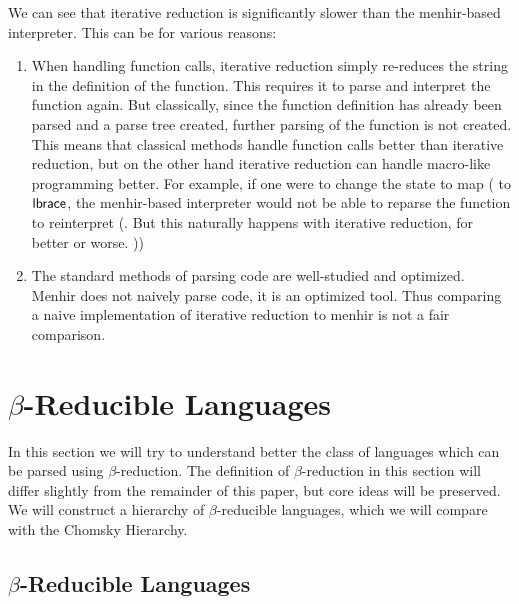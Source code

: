 \documentclass{llncs}
\begin{document}
We can see that iterative reduction is significantly slower than the menhir-based interpreter.
This can be for various reasons:
\begin{enumerate}

    \item When handling function calls, iterative reduction simply re-reduces the string in the definition of the function.
        This requires it to parse and interpret the function again.
        But classically, since the function definition has already been parsed and a parse tree created, further parsing of the function is not created.
        This means that classical methods handle function calls better than iterative reduction, but on the other hand iterative reduction can handle macro-like programming better.
        For example, if one were to change the state to map \ttt( to $\textsf{lbrace}$, the menhir-based interpreter would not be able to reparse the function to reinterpret \ttt(.
        But this naturally happens with iterative reduction, for better or worse.
        \gobble)\gobble)

    \item The standard methods of parsing code are well-studied and optimized.
        Menhir does not naively parse code, it is an optimized tool.
        Thus comparing a naive implementation of iterative reduction to menhir is not a fair comparison.
\end{enumerate}

\section{$\beta$-Reducible Languages}

In this section we will try to understand better the class of languages which can be parsed using $\beta$-reduction.
The definition of $\beta$-reduction in this section will differ slightly from the remainder of this paper, but core ideas will be preserved.
We will construct a hierarchy of $\beta$-reducible languages, which we will compare with the Chomsky Hierarchy.

\subsection{$\beta$-Reducible Languages}
\end{document}
